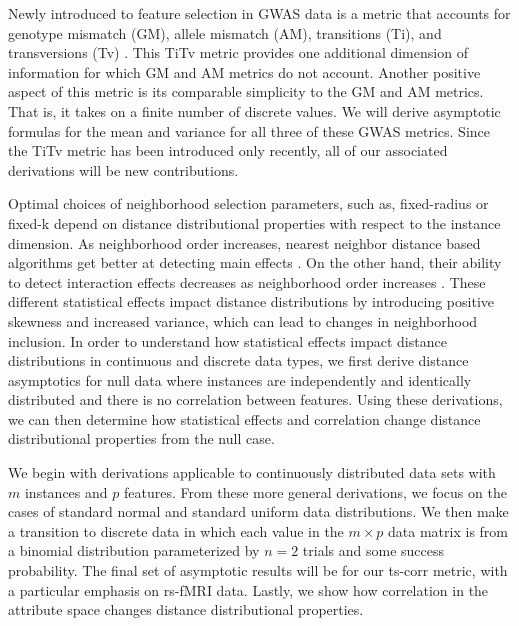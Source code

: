 \documentclass[10pt,letterpaper]{article}\usepackage[]{graphicx}\usepackage[]{color}
\begin{document}
Newly introduced to feature selection in GWAS data is a metric that accounts for genotype mismatch (GM), allele mismatch (AM), transitions (Ti), and transversions (Tv) \cite{arabnejad2018}. This TiTv metric provides one additional dimension of information for which GM and AM metrics do not account. Another positive aspect of this metric is its comparable simplicity to the GM and AM metrics. That is, it takes on a finite number of discrete values. We will derive asymptotic formulas for the mean and variance for all three of these GWAS metrics. Since the TiTv metric has been introduced only recently, all of our associated derivations will be new contributions. 

Optimal choices of neighborhood selection parameters, such as, fixed-radius or fixed-k depend on distance distributional properties with respect to the instance dimension. As neighborhood order increases, nearest neighbor distance based algorithms get better at detecting main effects \cite{stir}. On the other hand, their ability to detect interaction effects decreases as neighborhood order increases \cite{stir}. These different statistical effects impact distance distributions by introducing positive skewness and increased variance, which can lead to changes in neighborhood inclusion. In order to understand how statistical effects impact distance distributions in continuous and discrete data types, we first derive distance asymptotics for null data where instances are independently and identically distributed and there is no correlation between features. Using these derivations, we can then determine how statistical effects and correlation change distance distributional properties from the null case. 

We begin with derivations applicable to continuously distributed data sets with $m$ instances and $p$ features. From these more general derivations, we focus on the cases of standard normal and standard uniform data distributions. We then make a transition to discrete data in which each value in the $m \times p$ data matrix is from a binomial distribution parameterized by $n=2$ trials and some success probability. The final set of asymptotic results will be for our ts-corr metric, with a particular emphasis on rs-fMRI data. Lastly, we show how correlation in the attribute space changes distance distributional properties. 
\end{document}
